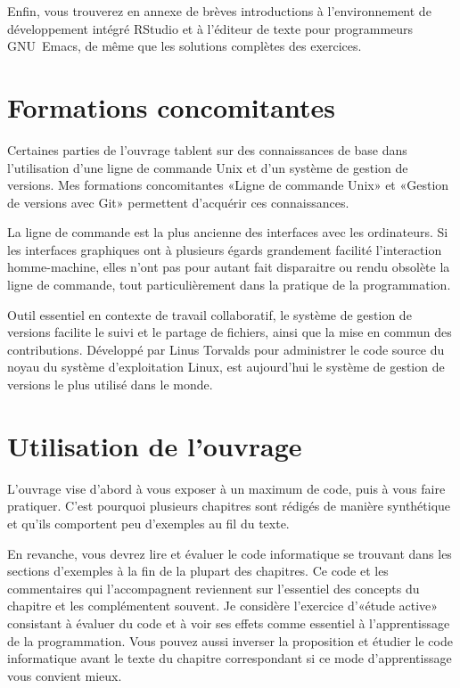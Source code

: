 Enfin, vous trouverez en annexe de brèves introductions à
l'environnement de développement intégré RStudio et à l'éditeur de
texte pour programmeurs GNU~Emacs, de même que les solutions complètes
des exercices.

\section*{Formations concomitantes}

Certaines parties de l'ouvrage tablent sur des connaissances de base
dans l'utilisation d'une ligne de commande Unix et d'un système de
gestion de versions. Mes formations concomitantes «Ligne de commande
Unix» et «Gestion de versions avec Git»
\citep{Goulet:laboratoire-cli:2021,Goulet:laboratoire-git:2021}
permettent d'acquérir ces connaissances.

La ligne de commande est la plus ancienne des interfaces avec les
ordinateurs. Si les interfaces graphiques ont à plusieurs égards
grandement facilité l'interaction homme-machine, elles n'ont pas pour
autant fait disparaitre ou rendu obsolète la ligne de commande, tout
particulièrement dans la pratique de la programmation.

Outil essentiel en contexte de travail collaboratif, le système de
gestion de versions facilite le suivi et le partage de fichiers, ainsi
que la mise en commun des contributions. Développé par Linus Torvalds
pour administrer le code source du noyau du système d'exploitation
Linux,  est aujourd'hui le système de
gestion de versions le plus utilisé dans le monde.


\section*{Utilisation de l'ouvrage}

L'ouvrage vise d'abord à vous exposer à un maximum de code, puis à
vous faire pratiquer. C'est pourquoi plusieurs chapitres sont rédigés
de manière synthétique et qu'ils comportent peu d'exemples au fil du
texte.

En revanche, vous devrez lire et évaluer le code informatique se
trouvant dans les sections d'exemples à la fin de la plupart des
chapitres. Ce code et les commentaires qui l'accompagnent reviennent
sur l'essentiel des concepts du chapitre et les complémentent souvent.
Je considère l'exercice d'«étude active» consistant à évaluer du code
et à voir ses effets comme essentiel à l'apprentissage de la
programmation. Vous pouvez aussi inverser la proposition et étudier le
code informatique avant le texte du chapitre correspondant si ce mode
d'apprentissage vous convient mieux.

